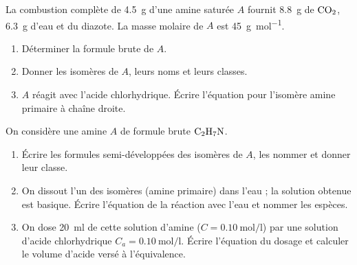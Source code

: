 \exo{} La combustion complète de \SI{4.5}{\gram} d'une amine saturée $A$
fournit \SI{8.8}{\gram} de $\ce{CO2}$, \SI{6.3}{\gram} d'eau et du diazote. La masse
molaire de $A$ est \SI{45}{\gram\per\mol}.
\begin{enumerate}[label=\arabic*)]
\item Déterminer la formule brute de $A$.
\item Donner les isomères de $A$, leurs noms et leurs classes.
\item $A$ réagit avec l'acide chlorhydrique. Écrire l'équation pour l'isomère amine
primaire à chaîne droite.
\end{enumerate}


On considère une amine $A$ de formule brute $\ce{C2H7N}$.
\begin{enumerate}[label=\arabic*)]
\item Écrire les formules semi-développées des isomères de $A$, les nommer et donner
leur classe.
\item On dissout l'un des isomères (amine primaire) dans l'eau ; la solution obtenue
est basique. Écrire l'équation de la réaction avec l'eau et nommer les espèces.
\item On dose \SI{20}{\milli\litre} de cette solution d'amine
($C = \SI{0.10}{\mol\per\litre}$) par une solution d'acide chlorhydrique
$C_a = \SI{0.10}{\mol\per\litre}$. Écrire l'équation du dosage et calculer le volume
d'acide versé à l'équivalence.
\end{enumerate}
